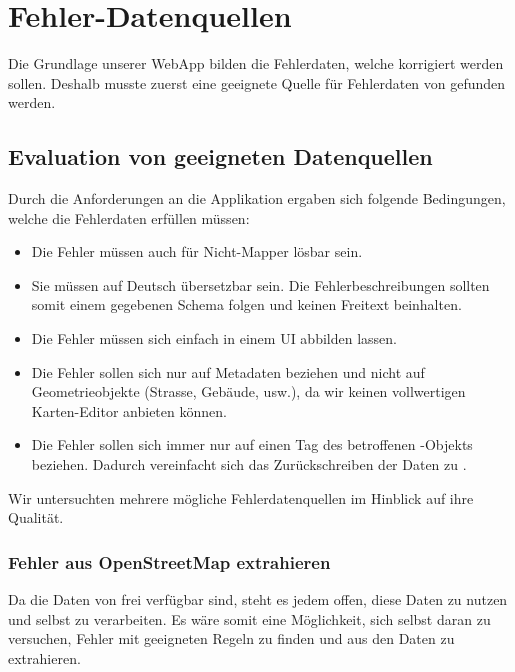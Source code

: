 \chapter{Fehler-Datenquellen}
\label{datenquellen}
Die Grundlage unserer \gls{WebApp} bilden die Fehlerdaten, welche korrigiert werden sollen.
Deshalb musste zuerst eine geeignete Quelle für Fehlerdaten von  gefunden werden.

\section{Evaluation von geeigneten Datenquellen}
Durch die Anforderungen an die Applikation ergaben sich folgende Bedingungen, welche die Fehlerdaten erfüllen müssen:

\begin{itemize}
\item Die Fehler müssen auch für Nicht-\gls{Mapper} lösbar sein.
\item Sie müssen auf Deutsch übersetzbar sein. Die Fehlerbeschreibungen sollten somit einem gegebenen Schema folgen und keinen Freitext beinhalten.
\item Die Fehler müssen sich einfach in einem UI abbilden lassen.
\item Die Fehler sollen sich nur auf Metadaten beziehen und nicht auf Geometrieobjekte (Strasse, Gebäude, usw.), da wir keinen vollwertigen Karten-Editor anbieten können.
\item Die Fehler sollen sich immer nur auf einen \gls{Tag} des betroffenen -Objekts beziehen. Dadurch vereinfacht sich das Zurückschreiben der Daten zu .
\end{itemize}

Wir untersuchten mehrere mögliche Fehlerdatenquellen im Hinblick auf ihre Qualität.

\subsection{Fehler aus OpenStreetMap extrahieren}
Da die Daten von  frei verfügbar sind, steht es jedem offen, diese Daten zu nutzen und selbst zu verarbeiten.
Es wäre somit eine Möglichkeit, sich selbst daran zu versuchen, Fehler mit geeigneten Regeln zu finden und aus den Daten zu extrahieren.

